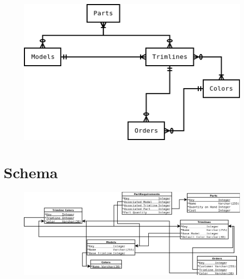 \documentclass[11pt,letterpaper,oneside]{amsart}
\begin{document}
\begin{figure}[H]
	\centerline{\includegraphics[scale=.7]{erddraft.png}}
\end{figure}

\section*{Schema}

\begin{figure}[H]
	\centerline{\includegraphics[scale=.55]{schema-draft.png}}
\end{figure}
\end{document}
